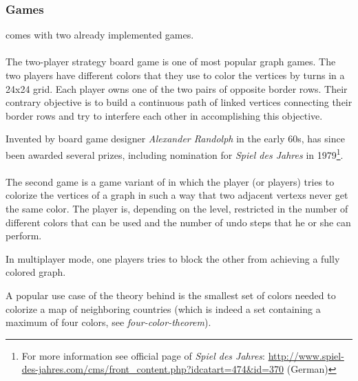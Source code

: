 \subsubsection{Games}
{\graphioli} comes with two already implemented games.\par
\paragraph{\twixt}
The two-player strategy board game {\twixt} is one of most popular graph games. The two players have different colors that they use to color the vertices by turns in a 24x24 grid. Each player owns one of the two pairs of opposite border rows. Their contrary objective is to build a continuous \gls{path} of linked vertices connecting their border rows and try to interfere each other in accomplishing this objective.\par
Invented by board game designer \emph{Alexander Randolph} in the early 60s, {\twixt} has since been awarded several prizes, including nomination for \emph{Spiel des Jahres} in 1979\footnote{For more information see official page of \emph{Spiel des Jahres}: \url{http://www.spiel-des-jahres.com/cms/front_content.php?idcatart=474&id=370} (German)}.\par
\paragraph{\graphcoloring}
The second game is a game variant of {\graphcoloring} in which the player (or players) tries to colorize the vertices of a graph in such a way that two \gls{adjacent} \glspl{vertex} never get the same color. The player is, depending on the level, restricted in the number of different colors that can be used and the number of \gls{undo} steps that he or she can perform.\par
In multiplayer mode, one players tries to block the other from achieving a fully colored graph.\par
A popular use case of the theory behind {\graphcoloring} is the smallest set of colors needed to colorize a map of neighboring countries (which is indeed a set containing a maximum of four colors, see \emph{\gls{four-color-theorem}}).\par